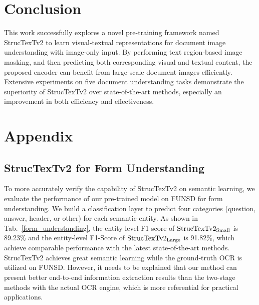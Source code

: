 \documentclass{article} %
\begin{document}
\section{Conclusion}
This work successfully explores a novel pre-training framework named StrucTexTv2 to learn visual-textual representations for document image understanding with image-only input. By performing text region-based image masking, and then predicting both corresponding visual and textual content, the proposed encoder can benefit from large-scale document images efficiently. Extensive experiments on five document understanding tasks demonstrate the superiority of StrucTexTv2 over state-of-the-art methods, especially an improvement in both efficiency and effectiveness.





\appendix
\clearpage
\section{Appendix}
\subsection{StrucTexTv2 for Form Understanding}
To more accurately verify the capability of StrucTexTv2 on semantic learning, we evaluate the performance of our pre-trained model on FUNSD for form understanding. We build a classification layer to predict four categories (question, answer, header, or other) for each semantic entity. As shown in Tab.~\ref{form_understanding}, the entity-level F1-score of $\rm StrucTexTv2_{Small}$ is 89.23\% and the entity-level F1-Score of $\rm StrucTexTv2_{Large}$ is 91.82\%, which achieve comparable performance with the latest state-of-the-art methods. StrucTexTv2 achieves great semantic learning while the ground-truth OCR is utilized on FUNSD. However, it needs to be explained that our method can present better end-to-end information extraction results than the two-stage methods with the actual OCR engine, which is more referential for practical applications.
\end{document}
